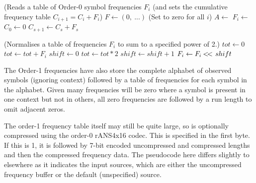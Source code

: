 \documentclass[a4paper]{article}
\begin{document}
\vskip 0.5cm

\begin{algorithmic}[1]
\Statex (Reads a table of Order-0 symbol frequencies $F_i$
\Statex (and sets the cumulative frequency table $C_{i+1} = C_i+F_i$)
\State $F \gets (0,\ ...)$ \Comment(Set to zero for all $i$)
\State $A \gets$ 
  \State $F_i \gets$ 
\EndForeach
\State
\State {}
\State
\State $C_0 \gets 0$
  \State $C_{s+1} \gets C_s + F_s$
\EndFor
\EndProcedure
\end{algorithmic}

\begin{algorithmic}[1]
\Statex (Normalises a table of frequencies $F_i$ to sum to a specified power of 2.)
\State $tot \gets 0$
  \State $tot \gets tot + F_i$
\EndFor
{}
  \State \Return
\EndIf
\State
\State $shift \gets 0$
  \State $tot \gets tot*2$
  \State $shift \gets shift+1$
\EndWhile
\State
{}
  \State $F_i \gets F_i \mathbin{<\mkern-3mu<\,} shift$
\EndFor
\EndProcedure
\end{algorithmic}

The Order-1 frequencies have also store the complete alphabet of
observed symbols (ignoring context) followed by a table of frequencies for
each symbol in the alphabet.  Given many frequencies will be zero
where a symbol is present in one context but not in others, all zero
frequencies are followed by a run length to omit adjacent zeros.

The order-1 frequency table itself may still be quite large, so is
optionally compressed using the order-0 rANS4x16 codec.  This is
specified in the first byte.  If this is 1, it is followed by 7-bit
encoded uncompressed and compressed lengths and then the compressed
frequency data.  The pseudocode here differs slightly to elsewhere as
it indicates the input sources, which are either the uncompressed
frequency buffer or the default (unspecified) source.

\end{document}
